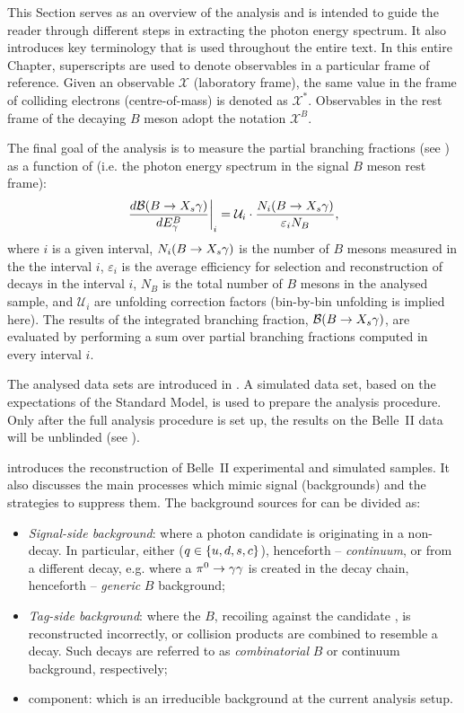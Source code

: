 This Section serves as an overview of the analysis
and is intended to guide the reader through different steps in extracting the \BtoXsgamma photon energy spectrum.
It also introduces key terminology that is used throughout the entire text.
In this entire Chapter, superscripts are used to denote observables in a particular frame of reference.
Given an observable $\mathcal{X}$ (laboratory frame), the same value in the frame of colliding electrons (centre-of-mass) is denoted as $\mathcal{X}^*$.
Observables in the rest frame of the decaying $B$ meson adopt the notation $\mathcal{X}^B$.

The final goal of the analysis is to measure the partial branching fractions (see )
as a function of \EB (i.e. the photon energy spectrum in the signal $B$ meson rest frame):
\begin{equation}\label{eq:branching_fraction_recipe}
    \left.\frac{d\mathcal{B}(\BtoXsgamma)}{d\EB}\right|_i = \mathcal{U}_i \cdot \frac{N_i(\BtoXsgamma)}{\varepsilon_i N_{B}},
\end{equation}
where $i$ is a given \EB interval,
$N_i(\BtoXsgamma)$ is the number of $B$ mesons measured in the the interval $i$, 
$\varepsilon_i$ is the average efficiency for selection and reconstruction of \BtoXsgamma decays in the interval $i$,
$N_B$ is the total number of $B$ mesons in the analysed sample,
and $\mathcal{U}_i$ are unfolding correction factors (bin-by-bin unfolding is implied here).
The results of the integrated branching fraction, $\mathcal{B}(\BtoXsgamma)$, are evaluated by performing a sum over partial branching fractions computed in every interval $i$.

The analysed data sets are introduced in .
A simulated data set, based on the expectations of the Standard Model, is used to prepare the analysis procedure.
Only after the full analysis procedure is set up, the results on the Belle~II data will be unblinded (see ).

 introduces the reconstruction of Belle~II experimental and simulated \BtoXsgamma samples.
It also discusses the main processes which mimic \BtoXsgamma signal (backgrounds) and the strategies to suppress them.
The background sources for \BtoXsgamma can be divided as:
\begin{itemize}
    \item \textit{Signal-side background}: where a photon candidate is originating in a non-\BtoXsgamma decay.
    In particular, either \epem\ra\qqbar ($q\in\{u,d,s,c\}$), henceforth -- \textit{continuum}, or from a different \B decay, e.g. where a $\pi^0\rightarrow\gamma\gamma$ is created in the decay chain, henceforth -- \textit{generic} $B$ background;
    \item \textit{Tag-side background}: where the $B$, recoiling against the candidate \BtoXsgamma, is reconstructed incorrectly, or \epem\ra\qqbar collision products are combined to resemble a \B decay.
    Such decays are referred to as \textit{combinatorial} $B$ or continuum background, respectively;
    \item \BtoXdgamma component: which is an irreducible background at the current analysis setup. 
\end{itemize}

